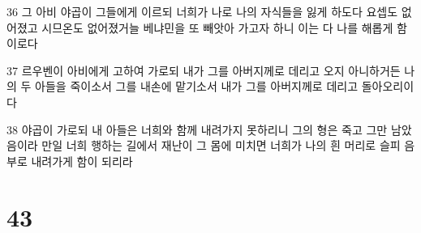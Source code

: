 \par 36 그 아비 야곱이 그들에게 이르되 너희가 나로 나의 자식들을 잃게 하도다 요셉도 없어졌고 시므온도 없어졌거늘 베냐민을 또 빼앗아 가고자 하니 이는 다 나를 해롭게 함이로다
\par 37 르우벤이 아비에게 고하여 가로되 내가 그를 아버지께로 데리고 오지 아니하거든 나의 두 아들을 죽이소서 그를 내손에 맡기소서 내가 그를 아버지께로 데리고 돌아오리이다
\par 38 야곱이 가로되 내 아들은 너희와 함께 내려가지 못하리니 그의 형은 죽고 그만 남았음이라 만일 너희 행하는 길에서 재난이 그 몸에 미치면 너희가 나의 흰 머리로 슬피 음부로 내려가게 함이 되리라

\chapter{43}

